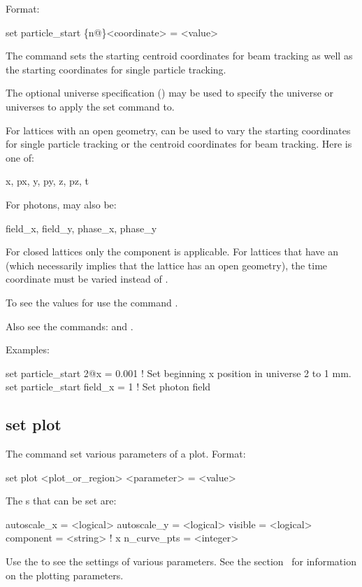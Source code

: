 {{Format:
\begin{example}
  set particle_start \{n@\}<coordinate> = <value>
\end{example}
The  command sets the starting centroid coordinates for beam tracking as well
as the starting coordinates for single particle tracking.

The optional  universe specification () may be used to specify the universe
or universes to apply the set command to.

For lattices with an open geometry,  can be used to vary
the starting coordinates for single particle tracking or the centroid coordinates for beam
tracking. Here  is one of:
\begin{example}
  x, px, y, py, z, pz, t
\end{example}
For photons,  may also be:
\begin{example}
  field_x, field_y, phase_x, phase_y
\end{example}
For closed lattices only the  component is applicable. For lattices that have an
 (which necessarily implies that the lattice has an open geometry), the time
 coordinate must be varied instead of .

To see the values for  use the command .

Also see the commands:  and .

Examples:
\begin{example}
  set particle_start 2@x = 0.001         ! Set beginning x position in universe 2 to 1 mm.
  set particle_start field_x = 1         ! Set photon field
\end{example}


\subsection{set plot}
\label{s:set.plot}

The  command set various parameters of a plot. Format:
\begin{example}
  set plot <plot_or_region> <parameter> = <value>
\end{example}

The s that can be set are:
\begin{example}
  autoscale_x        = <logical>
  autoscale_y        = <logical>
  visible            = <logical>
  component          = <string>    ! 
  x%
  n_curve_pts        = <integer>
\end{example}
Use the  to see the settings of various parameters. See the
section~ for information on the plotting parameters.

}}
